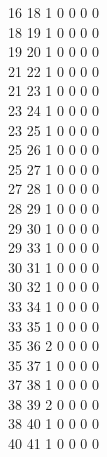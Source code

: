 \documentclass[11pt,titlepage,dvipdfmx,twoside]{jarticle}
\begin{document}
\begin{oframed}
{ 16 18  1  0  0  0  0                                                      \\
 18 19  1  0  0  0  0                                                      \\
 19 20  1  0  0  0  0                                                      \\
 21 22  1  0  0  0  0                                                      \\
 21 23  1  0  0  0  0                                                      \\
 23 24  1  0  0  0  0                                                      \\
 23 25  1  0  0  0  0                                                      \\
 25 26  1  0  0  0  0                                                      \\
 25 27  1  0  0  0  0                                                      \\
 27 28  1  0  0  0  0                                                      \\
 28 29  1  0  0  0  0                                                      \\
 29 30  1  0  0  0  0                                                      \\
 29 33  1  0  0  0  0                                                      \\
 30 31  1  0  0  0  0                                                      \\
 30 32  1  0  0  0  0                                                      \\
 33 34  1  0  0  0  0                                                      \\
 33 35  1  0  0  0  0                                                      \\
 35 36  2  0  0  0  0                                                      \\
 35 37  1  0  0  0  0                                                      \\
 37 38  1  0  0  0  0                                                      \\
 38 39  2  0  0  0  0                                                      \\
 38 40  1  0  0  0  0                                                      \\
 40 41  1  0  0  0  0                                                      \\
}
\end{oframed}
\end{document}

